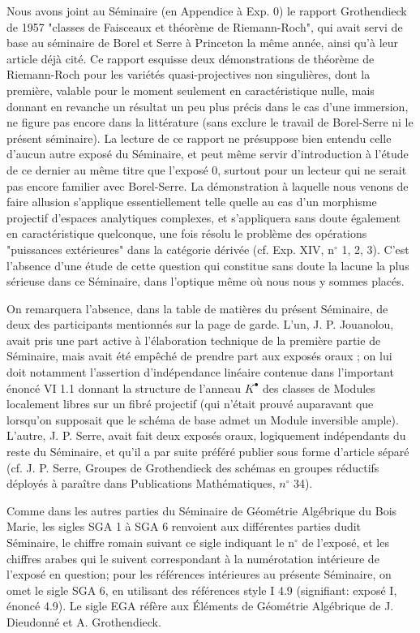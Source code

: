 Nous avons joint au Séminaire (en Appendice à Exp. 0) le rapport Grothendieck de 1957 "classes de Faisceaux 
et théorème de Riemann-Roch", qui avait servi de base au séminaire de Borel et Serre à Princeton la même année, 
ainsi qu’à leur article déjà cité. Ce rapport esquisse deux démonstrations de théorème de Riemann-Roch pour les 
variétés quasi-projectives non singulières, dont la première, valable pour le moment seulement en caractéristique 
nulle, mais donnant en revanche un résultat un peu plus précis dans le cas d’une immersion, ne figure pas encore 
dans la littérature (sans exclure le travail de Borel-Serre ni le présent séminaire). La lecture de ce rapport 
ne présuppose bien entendu celle d’aucun autre exposé du Séminaire, et peut même servir d’introduction à l’étude 
de ce dernier  au même titre que l’exposé 0, surtout pour un lecteur qui ne serait pas encore familier avec 
Borel-Serre. La démonstration à laquelle nous venons de faire allusion s’applique essentiellement telle quelle 
au cas d’un morphisme projectif d’espaces analytiques complexes, et s’appliquera sans doute également en 
caractéristique quelconque, une fois résolu le problème des opérations "puissances extérieures" dans la 
catégorie dérivée (cf. Exp. XIV, n$^\circ$ 1, 2, 3). C’est l’absence d’une étude de cette question qui constitue 
sans doute la lacune la plus sérieuse dans ce Séminaire, dans l’optique même où nous nous y sommes placés.

On remarquera l’absence, dans la table de matières du présent Séminaire, de deux des participants mentionnés 
sur la page de garde. L’un, J. P. Jouanolou, avait pris une part active à l’élaboration technique de la première 
partie de Séminaire, mais avait été empêché de prendre part aux exposés oraux ; on lui doit notamment 
l’assertion d’indépendance linéaire contenue dans l’important énoncé VI 1.1 donnant la structure de l’anneau 
$K^\bullet$ des classes de Modules localement libres sur un fibré projectif (qui n’était prouvé auparavant 
que lorsqu’on supposait que le schéma de base admet un Module inversible ample). L’autre, J. P. Serre, avait 
fait deux exposés oraux, logiquement indépendants du reste du Séminaire, et qu’il a par suite préféré publier 
sous forme d’article séparé (cf. J. P. Serre, Groupes de Grothendieck des schémas en groupes réductifs déployés 
à paraître dans Publications Mathématiques, $n^\circ$ 34).

Comme dans les autres parties du Séminaire de Géométrie Algébrique du Bois Marie, les sigles SGA 1 à SGA 6 
renvoient aux différentes parties dudit Séminaire, le chiffre romain suivant ce sigle indiquant le n$^\circ$ 
de l’exposé, et les chiffres arabes qui le suivent correspondant à la numérotation intérieure de l’exposé en 
question; pour les références intérieures au présente Séminaire, on omet le sigle SGA 6, en utilisant des références 
style I 4.9 (signifiant: exposé I, énoncé 4.9). Le sigle EGA réfère aux Éléments de Géométrie Algébrique de J. 
Dieudonné et A. Grothendieck.







